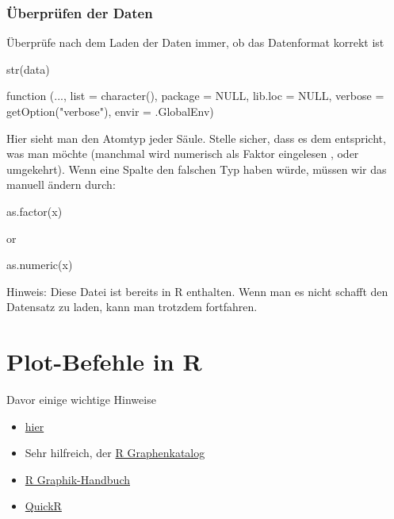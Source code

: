 \documentclass[a4paper,twoside]{tufte-book}\usepackage[]{graphicx}\usepackage[]{color}
\begin{document}
\begin{Anhang}
\subsection{Überprüfen der Daten}

Überprüfe nach dem Laden der Daten immer, ob das Datenformat korrekt ist

\begin{Schunk}
\begin{Sinput}
str(data)
\end{Sinput}
\begin{Soutput}
function (..., list = character(), package = NULL, lib.loc = NULL, 
    verbose = getOption("verbose"), envir = .GlobalEnv)  
\end{Soutput}
\end{Schunk}

Hier sieht man den Atomtyp jeder Säule. Stelle sicher, dass es dem entspricht, was man möchte (manchmal wird numerisch als Faktor eingelesen , oder umgekehrt). Wenn eine Spalte den falschen Typ haben würde, müssen wir das manuell ändern durch:

\begin{Schunk}
\begin{Sinput}
as.factor(x)
\end{Sinput}
\end{Schunk}
or 
\begin{Schunk}
\begin{Sinput}
as.numeric(x)
\end{Sinput}
\end{Schunk}


Hinweis: Diese Datei ist bereits in R enthalten. Wenn man es nicht schafft den Datensatz zu laden, kann man trotzdem fortfahren.

\chapter{Plot-Befehle in R}

Davor einige wichtige Hinweise

\begin{itemize}
\item \href{http://rgraphgallery.blogspot.de/search/label/3%20vartiable%20plots}{hier}
\item Sehr hilfreich, der \href{http://shiny.stat.ubc.ca/r-graph-catalog/#}{R Graphenkatalog}
\item \href{http://rgm3.lab.nig.ac.jp/RGM/R_image_list?page=2282&init=true}{R Graphik-Handbuch}
\item \href{http://www.statmethods.net/graphs/line.html}{QuickR}
\end{itemize}



\end{Anhang}
\end{document}
